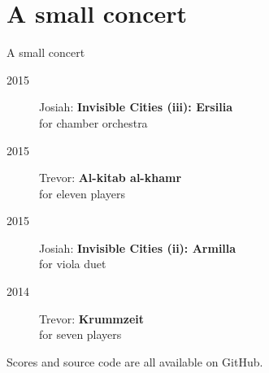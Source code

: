 \section{A small concert}

\begin{frame}{A small concert}
    \begin{description}
        \item[2015] Josiah: \textbf{Invisible Cities (iii): Ersilia} \\
            for chamber orchestra
        \item[2015] Trevor: \textbf{Al-kitab al-khamr} \\
            for eleven players
        \item[2015] Josiah: \textbf{Invisible Cities (ii): Armilla} \\
            for viola duet
        \item[2014] Trevor: \textbf{Krummzeit} \\
            for seven players
    \end{description}
    \begin{center}
        Scores and source code are all available on GitHub.
    \end{center}
\end{frame}

